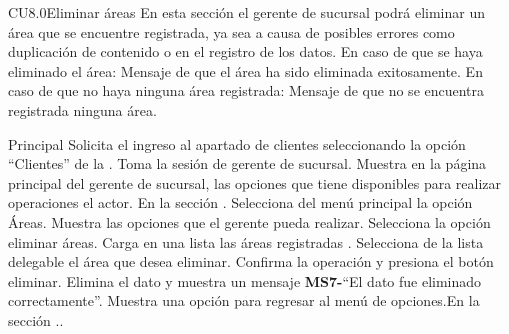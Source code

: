 

	\begin{UseCase}{CU8.0}{Eliminar áreas}{
		En esta sección el gerente de sucursal podrá eliminar un área que se encuentre registrada, ya sea a causa de posibles errores como duplicación de contenido o en el registro de los datos.
	}
		{
		En caso de que se haya eliminado el área:
		Mensaje de que el área ha sido eliminada exitosamente.
		En caso de que no haya ninguna área registrada:
		Mensaje de que no se encuentra registrada ninguna área.}

	\end{UseCase}

\begin{UCtrayectoria}{Principal}
		\UCpaso[\UCactor] Solicita el ingreso al apartado de clientes seleccionando la opción ``Clientes'' de la .
		\UCpaso Toma la sesión de gerente de sucursal.
		\UCpaso Muestra en la página principal del gerente de sucursal, las opciones que tiene disponibles para realizar operaciones el actor. En la sección .
		\UCpaso[\UCactor] Selecciona del menú principal la opción Áreas.
		\UCpaso Muestra las opciones que el gerente pueda realizar.
		\UCpaso[\UCactor] Selecciona la opción eliminar áreas.
		\UCpaso Carga en una lista las áreas registradas .
		\UCpaso[\UCactor] Selecciona de la lista delegable el área que desea eliminar.
		\UCpaso[\UCactor] Confirma la operación y presiona el botón eliminar.
		\UCpaso Elimina el dato y muestra un mensaje {\bf MS7-}``El dato fue eliminado correctamente''.
		\UCpaso Muestra una opción para regresar al menú de opciones.En la sección .. 
	\end{UCtrayectoria}

